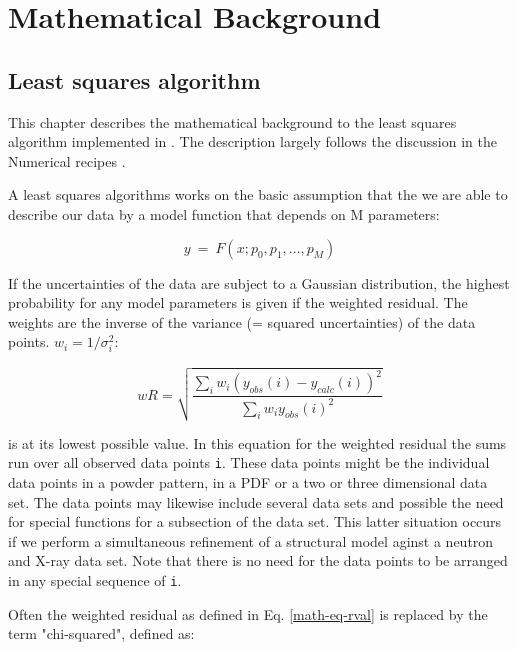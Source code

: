 
\chapter{Mathematical Background \label{math}}
\section{Least squares algorithm \label{math-lsq}}

This chapter describes the mathematical background to the least squares
algorithm implemented in . The description largely follows the 
discussion in the Numerical recipes \cite{prstla2005}. 

A least squares algorithms works on the basic assumption that the
we are able to describe our data by a model function that depends on 
M parameters:

\begin{equation}
  y ~=~ F(x; p_{0}, p_{1}, ..., p_{M})
\end{equation}

If the uncertainties of the data are subject to a Gaussian distribution,
the highest probability for any model parameters is given if the 
weighted residual. The weights are the inverse of the variance (= squared
uncertainties) of the data points. $w_{i} = 1/\sigma_{i}^{2}$:

\begin{equation}
   wR = \sqrt{\frac{\sum_{i} w_{i} (y_{obs}(i) - y_{calc}(i))^2}
                   {\sum_{i} w_{i} y_{obs}(i)^2}}
  \label{math-eq-rval}
\end{equation}

is at its lowest possible value. 
In this equation for the weighted residual the sums run over all
observed data points {\tt i}. These data points might be the 
individual data points in a powder pattern, in a PDF or a two or 
three dimensional data set. The data points may likewise include
several data sets and possible the need for special functions for
a subsection of the data set. This latter situation occurs if we perform
a simultaneous refinement of a structural model aginst a neutron and
X-ray data set. Note that there is no need for the data points to be 
arranged in any special sequence of {\tt i}.

Often the weighted residual as defined in Eq. \ref{math-eq-rval} is replaced
by the term "chi-squared", defined as:

